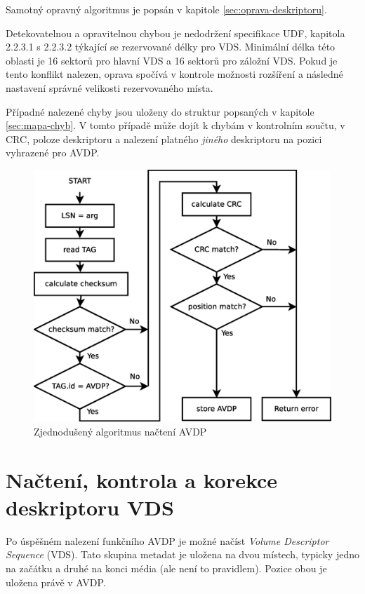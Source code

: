 Samotný opravný algoritmus je popsán v kapitole \ref{sec:oprava-deskriptoru}.

Detekovatelnou a opravitelnou chybou je nedodržení specifikace UDF\cite{osta-udf-0201}, kapitola 2.2.3.1 s 2.2.3.2 týkající se rezervované délky pro VDS. Minimální délka této oblasti je 16 sektorů pro hlavní VDS a 16 sektorů pro záložní VDS. Pokud je tento konflikt nalezen, oprava spočívá v kontrole možnosti rozšíření a následné nastavení správné velikosti rezervovaného místa.

Případné nalezené chyby jsou uloženy do struktur popsaných v kapitole \ref{sec:mapa-chyb}. V tomto případě může dojít k chybám v kontrolním součtu, v CRC, poloze deskriptoru a nalezení platného \emph{jiného} deskriptoru na pozici vyhrazené pro AVDP.

\begin{figure}[ht] 
    \centering
    \includegraphics[scale=0.4]{obrazky/avdp.eps}
    \caption{Zjednodušený algoritmus načtení AVDP}
    \label{fig:avdp}
\end{figure}

\section{Načtení, kontrola a korekce deskriptoru VDS}
\label{sec:nacteni-a-oprava-vds}
Po úspěšném nalezení funkčního AVDP je možné načíst \textit{Volume Descriptor Sequence} (VDS). Tato skupina metadat je uložena na dvou místech, typicky jedno na začátku a druhé na konci média (ale není to pravidlem). Pozice obou je uložena právě v AVDP.

